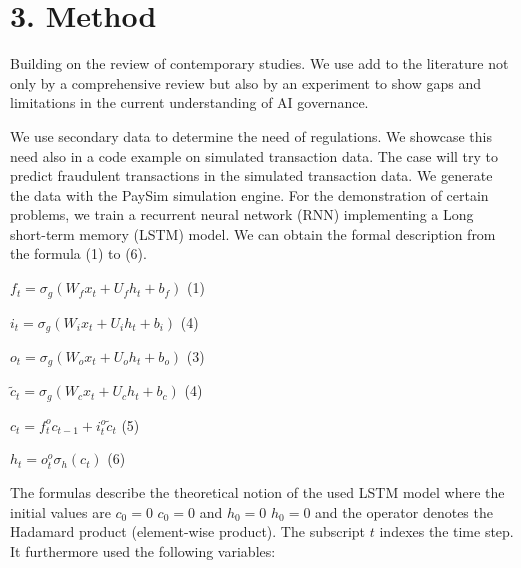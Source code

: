 \documentclass[jou,apacite]{apa6}
\begin{document}
\section{3. Method}

Building on the review of contemporary studies. We use add to the literature not only by a comprehensive review but also by an experiment to show gaps and limitations in the current understanding of AI governance. \par

We use secondary data to determine the need of regulations. We showcase this need also in a code example on simulated transaction data.  The case will try to predict fraudulent transactions in the simulated transaction data. We generate the data with the PaySim simulation engine. For the demonstration of certain problems, we train a recurrent neural network (RNN) implementing a Long short-term memory (LSTM) model. We can obtain the formal description from the formula (1) to (6).\par

$f_t = \sigma_g (W_f x_t+U_f h_t+b_f)$ (1)\par
$i_t = \sigma_g (W_i x_t+U_i h_t+b_i)$ (4)\par
$o_t = \sigma_g (W_o x_t+U_o h_t+b_o)$ (3)\par
$\tilde{c}_t = \sigma_g (W_c x_t+U_c h_t+b_c)$ (4)\par
$c_t=f_t^o c_{t-1}+i_t^o\tilde{c}_t$ (5)\par
$h_t=o_t^o\sigma_h(c_t)$ (6)\par

The formulas describe the theoretical notion of the used LSTM model where the initial values are  $c_{0}=0$ $c_{0}=0$ and $h_{0}=0$ $h_{0}=0$ and the operator  denotes the Hadamard product (element-wise product). The subscript $t$ indexes the time step. It furthermore used the following variables:\par
\end{document}
